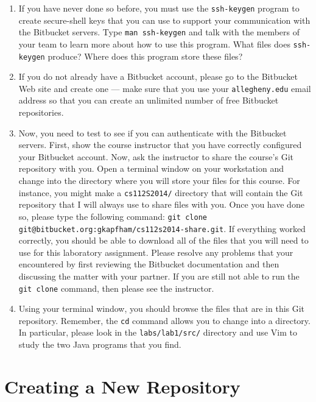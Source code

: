 \begin{enumerate}
	
  \item If you have never done so before, you must use the {\tt ssh-keygen} program to create secure-shell keys that you
    can use to support your communication with the Bitbucket servers.  Type {\tt man ssh-keygen} and talk with the
    members of your team to learn more about how to use this program.  What files does {\tt ssh-keygen} produce?  Where
    does this program store these files?

  \item If you do not already have a Bitbucket account, please go to the Bitbucket Web site and create one --- 
    make sure that you use your {\tt allegheny.edu} email address so that you can create an unlimited number of free
    Bitbucket repositories.

  \item Now, you need to test to see if you can authenticate with the Bitbucket servers.  First, show the course
    instructor that you have correctly configured your Bitbucket account.  Now, ask the instructor to share the course's
    Git repository with you.  Open a terminal window on your workstation and change into the directory where you will
    store your files for this course.  For instance, you might make a {\tt cs112S2014/} directory that will contain the
    Git repository that I will always use to share files with you.  Once you have done so, please type the following
    command: {\tt git clone git@bitbucket.org:gkapfham/cs112s2014-share.git}.  If everything worked correctly, you
    should be able to download all of the files that you will need to use for this laboratory assignment. Please resolve
    any problems that your encountered by first reviewing the Bitbucket documentation and then discussing the matter
    with your partner. If you are still not able to run the {\tt git clone} command, then please see the instructor.

  \item Using your terminal window, you should browse the files that are in this Git repository. Remember,
    the {\tt cd} command allows you to change into a directory.  In particular, please look in the {\tt labs/lab1/src/}
    directory and use Vim to study the two Java programs that you find.

\end{enumerate}

\section*{Creating a New Repository}

